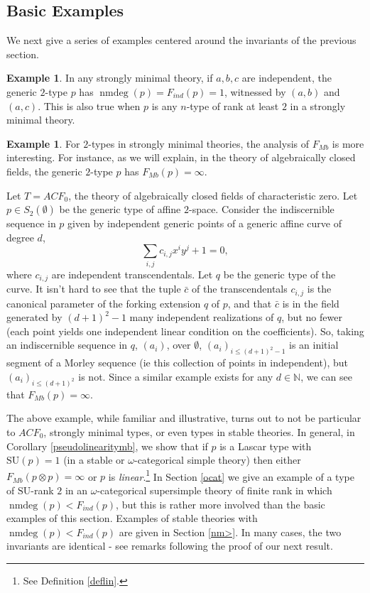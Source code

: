 \documentclass[11pt]{amsart}
\def\nmdeg{\mathop{\rm nmdeg}}
\def\nmdeg{\operatorname{nmdeg}}
\newcommand{\Fmb}[1]{F_{Mb}\left( #1  \right)}
\theoremstyle{definition}
\newtheorem{example}[theorem]{Example}
\theoremstyle{remark}
\newcommand{\m}{\mathbb }
\newcommand{\mb}{F_{Mb} }
\numberwithin{equation}{section}
\begin{document}
\subsection{Basic Examples} 
We next give a series of examples centered around the invariants of the previous section.

\begin{example} In any strongly minimal theory, if $a,b,c$ are independent, the
generic $2$-type $p$ has $\nmdeg(p) = F_{ind}(p)= 1$, witnessed by $(a,b)$
and $(a,c)$. This is also true when $p$ is any $n$-type of rank at least $2$ in a strongly minimal theory. 
\end{example}

\begin{example} \label{ACFMB}
For $2$-types in strongly minimal theories, the analysis of $\mb$ is more interesting. For instance, as we will explain, in the theory of algebraically closed fields, the generic $2$-type $p$ has $\mb(p)=\infty$.

Let $T=ACF_0$, the theory of algebraically closed fields of characteristic zero. Let $p \in S_2 ( \emptyset )$ be the generic type of affine $2$-space. 
Consider the indiscernible sequence in $p$ given by independent generic points of a generic affine curve of degree $d$, 
$$\sum_{i,j} c_{i,j} x^i y^j  +1 = 0,$$
where $c_{i,j}$ are independent transcendentals. 
Let $q$ be the generic type of the curve. It isn't hard to see that the tuple $\bar c$ of the transcendentals $c_{i,j}$ is the canonical parameter of the forking extension $q$ of $p$, and that $\bar c$ is in the field generated by $(d+1)^2-1$ many independent realizations of $q$, but no fewer (each point yields one independent linear condition on the coefficients). 
So, taking an indiscernible sequence in $q$, $(a_i)$, over $\emptyset$, $(a_i)_{i \leq (d+1)^2-1}$ is an initial segment of a Morley sequence (ie this collection of points in independent), but $(a_i)_{i \leq (d+1)^2}$ is not. Since a similar example exists for any $d \in \m N$, we can see that $\mb {(p)} = \infty$. 
\end{example}

The above example, while familiar and illustrative, turns out to not be particular to $ACF_0$, strongly minimal types, or even types in stable theories. In general, in Corollary \ref{pseudolinearitymb}, we show that if $p$ is a Lascar type with $\mathrm{SU}(p) = 1$ (in a stable or $\omega$-categorical simple theory) then either $\Fmb{p \otimes p} = \infty$ or $p$ is \emph{linear}.\footnote{See Definition \ref{deflin}.} 
In Section \ref{ocat} we give an example of a type of $\mathrm{SU}$-rank $2$ in an $\omega$-categorical supersimple theory of finite rank in which $\nmdeg (p) < F_{ind} (p)$, but this is rather more involved than the basic examples of this section.
Examples of stable theories with $\nmdeg (p) < F_{ind} (p)$ are given in Section \ref{nm>}.
In many cases, the two invariants are identical - see remarks following the proof of our next result. 
\end{document}
